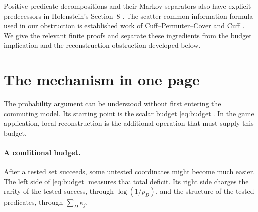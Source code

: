 \documentclass[11pt,reqno]{amsart}
\numberwithin{equation}{section}
\theoremstyle{definition}
\theoremstyle{remark}
\begin{document}
Positive predicate decompositions and their Markov separators also have explicit predecessors in Holenstein's Section~8 \cite{Holenstein}. The scatter common-information formula used in our obstruction is established work of Cuff--Permuter--Cover and Cuff \cite{CPC,Cuff}. We give the relevant finite proofs and separate these ingredients from the budget implication and the reconstruction obstruction developed below.


\clearpage

\section{The mechanism in one page}\label{sec:overview}
The probability argument can be understood without first entering the commuting model. Its starting point is the scalar budget \eqref{eq:budget}. In the game application, local reconstruction is the additional operation that must supply this budget.

\begin{center}
\end{center}

\paragraph{A conditional budget.}
After a tested set succeeds, some untested coordinates might become much easier. The left side of \eqref{eq:budget} measures that total deficit. Its right side charges the rarity of the tested success, through \(\log(1/p_D)\), and the structure of the tested predicates, through \(\sum_D\kappa_j\).
\end{document}
